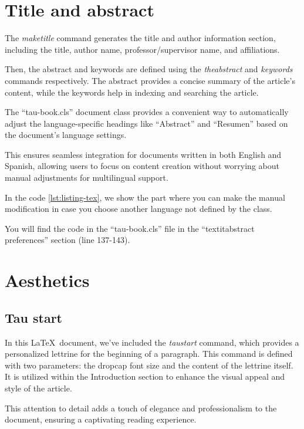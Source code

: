 \documentclass[10pt,a4paper,twoside]{tau-book}
\begin{document}
\section{Title and abstract}

    The \textit{maketitle} command generates the title and author information section, including the title, author name, professor/supervisor name, and affiliations.

    Then, the abstract and keywords are defined using the \textit{theabstract} and \textit{keywords} commands respectively. The abstract provides a concise summary of the article's content, while the keywords help in indexing and searching the article.

    The ``tau-book.cls'' document class provides a convenient way to automatically adjust the language-specific headings like ``Abstract'' and ``Resumen'' based on the document's language settings.

    This ensures seamless integration for documents written in both English and Spanish, allowing users to focus on content creation without worrying about manual adjustments for multilingual support.

    In the code \ref{lst:listing-tex}, we show the part where you can make the manual modification in case you choose another language not defined by the class.

    

    You will find the code in the ``tau-book.cls'' file in the ``textit{abstract preferences}'' section (line 137-143).

\section{Aesthetics}

    \subsection{Tau start}

        In this \LaTeX\ document, we've included the \textit{taustart} command, which provides a personalized lettrine for the beginning of a paragraph. This command is defined with two parameters: the dropcap font size and the content of the lettrine itself. It is utilized within the Introduction section to enhance the visual appeal and style of the article.

        This attention to detail adds a touch of elegance and professionalism to the document, ensuring a captivating reading experience.
\end{document}
